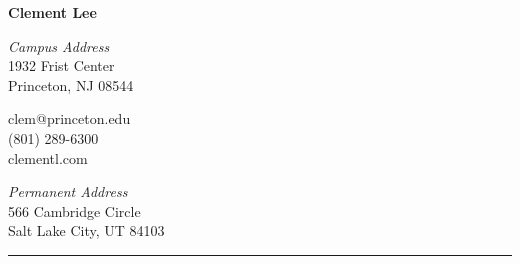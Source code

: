 \documentclass[11pt]{article}
\begin{document}
\begin{center}

\vspace{-5em}
{\LARGE {\textbf{Clement Lee}}}

\begin{multicols}{3}
\begin{flushright}
\emph{Campus Address}\\
1932 Frist Center\\
Princeton, NJ 08544
\end{flushright}
clem@princeton.edu\\
(801) 289-6300\\
clementl.com
\begin{flushleft}
\emph{Permanent Address}\\
566 Cambridge Circle\\
Salt Lake City, UT 84103
\end{flushleft}
\end{multicols}
\end{center}

\hrule
\vspace{-1em}
\end{document}

